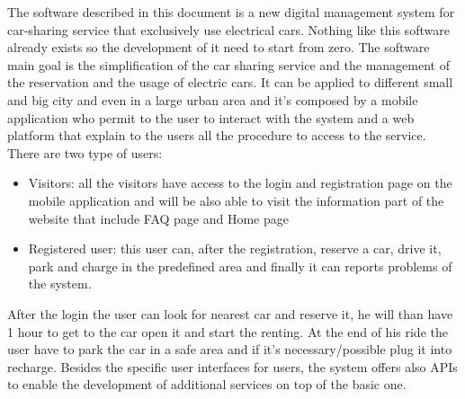 The software described in this document is a new digital management system for car-sharing service that exclusively use electrical cars. Nothing like this software already exists so the development of it need to start from zero. The software main goal is the simplification of the car sharing service and the management of the reservation and the usage of electric cars. It can be applied to different small and big city and even in a large urban area and it's composed by a mobile application who permit to the user to interact with the system and a web platform that explain to the users all the procedure to access to the service. 
There are two type of users:
\begin{itemize}
	\item Visitors: all the visitors have access to the login and registration page on the mobile application and will be also able to visit the information part of the website that include FAQ page and Home page
	\item Registered user: this user can, after the registration, reserve a car, drive it, park and charge in the predefined area and finally it can reports problems of the system.
\end{itemize}
After the login the user can look for nearest car and reserve it, he will than have 1 hour to get to the car open it and start the renting. At the end of his ride the user have to park the car in a safe area and if it's necessary/possible plug it into recharge.
Besides the specific user interfaces for users, the system offers also APIs to enable the development of additional services on top of the basic one.